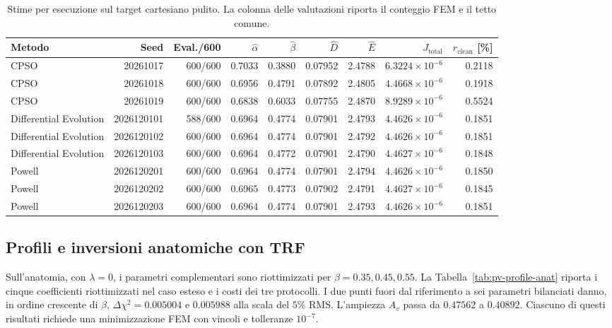 \begin{table}[H]
\centering
\caption{Stime per esecuzione sul target cartesiano pulito. La colonna delle valutazioni riporta il conteggio FEM e il tetto comune.}
\label{tab:app-optimizer-runs}
\small
\setlength{\tabcolsep}{6.5pt}
\begin{tabular}{@{}lrrrrrrrr@{}}
\toprule
Metodo & Seed & Eval./600 & $\hat{\alpha}$ & $\hat{\beta}$ & $\hat{D}$ & $\hat{E}$ & $J_{\mathrm{total}}$ & $r_{\mathrm{clean}}$ [\%] \\
\midrule
CPSO                   & 20261017   & 600/600 & 0.7033 & 0.3880 & 0.07952 & 2.4788 & $6.3224\times10^{-6}$ & 0.2118 \\
CPSO                   & 20261018   & 600/600 & 0.6956 & 0.4791 & 0.07892 & 2.4805 & $4.4668\times10^{-6}$ & 0.1918 \\
CPSO                   & 20261019   & 600/600 & 0.6838 & 0.6033 & 0.07755 & 2.4870 & $8.9289\times10^{-6}$ & 0.5524 \\
\midrule
Differential Evolution & 2026120101 & 588/600 & 0.6964 & 0.4774 & 0.07901 & 2.4793 & $4.4626\times10^{-6}$ & 0.1851 \\
Differential Evolution & 2026120102 & 600/600 & 0.6964 & 0.4774 & 0.07901 & 2.4792 & $4.4626\times10^{-6}$ & 0.1851 \\
Differential Evolution & 2026120103 & 600/600 & 0.6964 & 0.4772 & 0.07901 & 2.4790 & $4.4627\times10^{-6}$ & 0.1848 \\
\midrule
Powell                 & 2026120201 & 600/600 & 0.6964 & 0.4774 & 0.07901 & 2.4794 & $4.4626\times10^{-6}$ & 0.1850 \\
Powell                 & 2026120202 & 600/600 & 0.6965 & 0.4773 & 0.07902 & 2.4791 & $4.4627\times10^{-6}$ & 0.1845 \\
Powell                 & 2026120203 & 600/600 & 0.6964 & 0.4774 & 0.07901 & 2.4793 & $4.4626\times10^{-6}$ & 0.1851 \\
\bottomrule
\end{tabular}
\end{table}

\subsection{Profili e inversioni anatomiche con TRF}
Sull'anatomia, con $\lambda=0$, i parametri complementari sono riottimizzati per $\beta=0.35,0.45,0.55$. La Tabella~\ref{tab:pv-profile-anat} riporta i cinque coefficienti riottimizzati nel caso esteso e i costi dei tre protocolli. I due punti fuori dal riferimento a sei parametri bilanciati danno, in ordine crescente di $\beta$, $\Delta\chi^2=0.005004$ e $0.005988$ alla scala del $5\%$ RMS. L'ampiezza $A_v$ passa da $0.47562$ a $0.40892$. Ciascuno di questi risultati richiede una minimizzazione FEM con vincoli e tolleranze $10^{-7}$.

